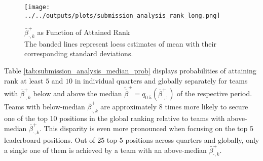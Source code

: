 \documentclass[3p,times,twocolumn]{elsarticle}
\begin{document}
\begin{figure}[!htbp]
    \centering
    \texttt{[image: ../../outputs/plots/submission\_analysis\_rank\_long.png]}
    \caption{$\bar{\beta}_{\cdot,k}^{+}$ as Function of Attained Rank\\
        The banded lines represent loess estimates of mean with their corresponding standard deviations.
    }
    \label{fig:submission_analysis_rank_long}
\end{figure}

Table \ref{tab:submission_analysis_median_prob} displays probabilities of attaining rank at least $5$ and $10$ in individual quarters and globally separately for teams with $\bar{\beta}^{+}_{\cdot,k}$ below and above the median $\tilde{\bar{\beta}}^{+}_{\cdot} = q_{0.5}(\bar{\beta}^{+}_{\cdot, :})$ of the respective period.
Teams with below-median $\bar{\beta}^{+}_{\cdot,k}$ are approximately 8 times more likely to secure one of the top 10 positions in the global ranking relative to teams with above-median $\bar{\beta}^{+}_{\cdot,k}$.
This disparity is even more pronounced when focusing on the top 5 leaderboard positions. 
Out of 25 top-5 positions across quarters and globally, only a single one of them is achieved by a team with an above-median $\bar{\beta}^{+}_{\cdot,k}$.
\end{document}
